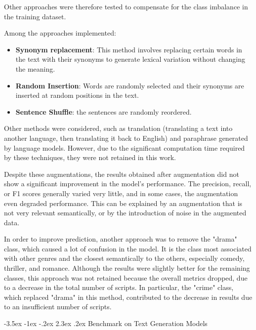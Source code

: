 \documentclass[12pt]{report}
\makeatletter
\renewcommand{\chapter}{\@startsection{chapter}{0}{\z@}
  {-3.5ex \@plus -1ex \@minus -.2ex}
  {2.3ex \@plus.2ex}
  {\normalfont\LARGE\bfseries}}
\makeatother
\begin{document}
 

Other approaches were therefore tested to compensate for the class imbalance in the training dataset. 

Among the approaches implemented: 

\begin{itemize}
    \item \textbf{Synonym replacement}: This method involves replacing certain words in the text with their synonyms to generate lexical variation without changing the meaning.
    \item \textbf{Random Insertion}: Words are randomly selected and their synonyms are inserted at random positions in the text.
    \item \textbf{Sentence Shuffle}: the sentences are randomly reordered.
\end{itemize}


Other methods were considered, such as translation (translating a text into another language, then translating it back to English) and paraphrase generated by language models. However, due to the significant computation time required by these techniques, they were not retained in this work. 

Despite these augmentations, the results obtained after augmentation did not show a significant improvement in the model's performance. The precision, recall, or F1 scores generally varied very little, and in some cases, the augmentation even degraded performance. This can be explained by an augmentation that is not very relevant semantically, or by the introduction of noise in the augmented data. 

In order to improve prediction, another approach was to remove the "drama" class, which caused a lot of confusion in the model. It is the class most associated with other genres and the closest semantically to the others, especially comedy, thriller, and romance. Although the results were slightly better for the remaining classes, this approach was not retained because the overall metrics dropped, due to a decrease in the total number of scripts. In particular, the "crime" class, which replaced "drama" in this method, contributed to the decrease in results due to an insufficient number of scripts. 

\vspace{1.5\baselineskip}

\chapter{Benchmark on Text Generation Models}
\end{document}
